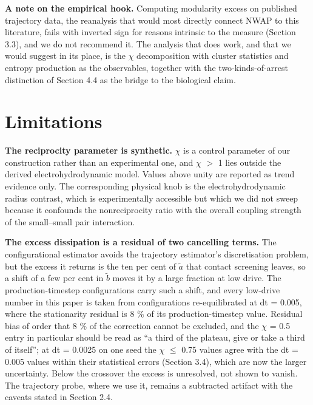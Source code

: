 \documentclass[aps,pre,preprint,superscriptaddress,nofootinbib,longbibliography]{revtex4-2}
\begin{document}
\textbf{A note on the empirical hook.} Computing modularity excess on published trajectory data, the reanalysis that would most directly connect NWAP to this literature, fails with inverted sign for reasons intrinsic to the measure (Section 3.3), and we do not recommend it. The analysis that does work, and that we would suggest in its place, is the $\chi$ decomposition with cluster statistics and entropy production as the observables, together with the two-kinds-of-arrest distinction of Section 4.4 as the bridge to the biological claim.

\section{Limitations}

\textbf{The reciprocity parameter is synthetic.} $\chi$ is a control parameter of our construction rather than an experimental one, and $\chi$ $>$ 1 lies outside the derived electrohydrodynamic model. Values above unity are reported as trend evidence only. The corresponding physical knob is the electrohydrodynamic radius contrast, which is experimentally accessible but which we did not sweep because it confounds the nonreciprocity ratio with the overall coupling strength of the small--small pair interaction.

\textbf{The excess dissipation is a residual of two cancelling terms.} The configurational estimator avoids the trajectory estimator's discretisation problem, but the excess it returns is the ten per cent of $\tilde a$ that contact screening leaves, so a shift of a few per cent in $\tilde b$ moves it by a large fraction at low drive. The production-timestep configurations carry such a shift, and every low-drive number in this paper is taken from configurations re-equilibrated at dt = 0.005, where the stationarity residual is 8 \% of its production-timestep value. Residual bias of order that 8 \% of the correction cannot be excluded, and the $\chi$ = 0.5 entry in particular should be read as ``a third of the plateau, give or take a third of itself''; at dt = 0.0025 on one seed the $\chi$ $\le$ 0.75 values agree with the dt = 0.005 values within their statistical errors (Section 3.4), which are now the larger uncertainty. Below the crossover the excess is unresolved, not shown to vanish. The trajectory probe, where we use it, remains a subtracted artifact with the caveats stated in Section 2.4.
\end{document}
